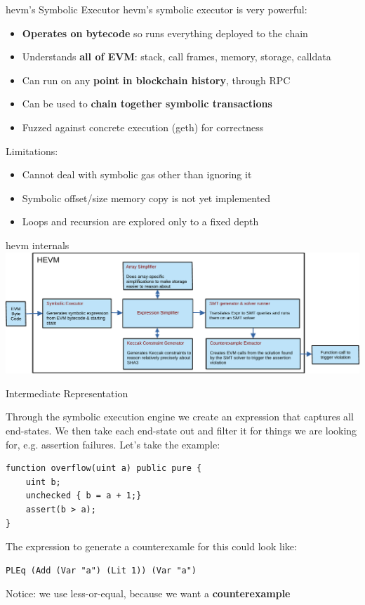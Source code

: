 \documentclass[aspectratio=169]{beamer}
\begin{document}
\begin{frame}{hevm's Symbolic Executor}
hevm's symbolic executor is very powerful:
\begin{itemize}
\item \textbf{Operates on bytecode} so runs everything deployed to the chain
\item Understands \textbf{all of EVM}: stack, call frames, memory, storage, calldata
\item Can run on any \textbf{point in blockchain history}, through RPC
\item Can be used to \textbf{chain together symbolic transactions}
\item Fuzzed against concrete execution (geth) for correctness
\end{itemize}
\bigskip

Limitations:
\begin{itemize}
\item Cannot deal with symbolic gas other than ignoring it
\item Symbolic offset/size memory copy is not yet implemented
\item Loops and recursion are explored only to a fixed depth
\end{itemize}
\end{frame}

\begin{frame}{hevm internals}
\centering
\includegraphics[scale=0.6]{hevm-overview}

\end{frame}



\begin{frame}[fragile=singleslide]{Intermediate Representation}
\small

Through the symbolic execution engine we create an expression that captures all end-states. We then take each end-state out and filter it for things we are looking for, e.g. assertion failures. Let's take the example:


\begin{Verbatim}[frame=single, framerule=0.2mm,framesep=2mm,fontsize=\small]
function overflow(uint a) public pure {
	uint b;
	unchecked { b = a + 1;}
	assert(b > a);
}
\end{Verbatim}

The expression to generate a counterexamle for this could look like:

\begin{Verbatim}[frame=single, framerule=0.2mm, framesep=2mm,fontsize=\small]
PLEq (Add (Var "a") (Lit 1)) (Var "a")
\end{Verbatim}

Notice: we use less-or-equal, because we want a \textbf{counterexample}
\end{frame}
\end{document}
